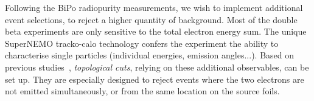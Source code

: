Following the BiPo radiopurity measurements, we wish to implement additional event selections, to reject a higher quantity of background.
Most of the double beta experiments are only sensitive to the total electron energy sum.
The unique SuperNEMO tracko-calo technology confers the experiment the ability to characterise single particles (individual energies, emission angles...).
Based on previous studies~\cite{CalvezThesis,ChaponThesis}, \emph{topological cuts}, relying on these additional observables, can be set up.
They are especially designed to reject events where the two electrons are not emitted simultaneously, or from the same location on the source foils.

